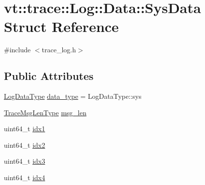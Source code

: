 \hypertarget{structvt_1_1trace_1_1_log_1_1_data_1_1_sys_data}{}\section{vt\+:\+:trace\+:\+:Log\+:\+:Data\+:\+:Sys\+Data Struct Reference}
\label{structvt_1_1trace_1_1_log_1_1_data_1_1_sys_data}


{\ttfamily \#include $<$trace\+\_\+log.\+h$>$}

\subsection*{Public Attributes}
\begin{DoxyCompactItemize}
\item 
\hyperlink{structvt_1_1trace_1_1_log_ae1c08093fd18967b7d4912d04d6acc3d}{Log\+Data\+Type} \hyperlink{structvt_1_1trace_1_1_log_1_1_data_1_1_sys_data_abf36342ab6f92372bf13cf35be7bbb25}{data\+\_\+type} = Log\+Data\+Type\+::sys
\item 
\hyperlink{namespacevt_1_1trace_aeb598f45d67d41db7902e494f2f0ce59}{Trace\+Msg\+Len\+Type} \hyperlink{structvt_1_1trace_1_1_log_1_1_data_1_1_sys_data_a514d2e0977e4acf99920ed45a910ae0a}{msg\+\_\+len}
\item 
uint64\+\_\+t \hyperlink{structvt_1_1trace_1_1_log_1_1_data_1_1_sys_data_a446ec2588d49845c97e4485695943041}{idx1}
\item 
uint64\+\_\+t \hyperlink{structvt_1_1trace_1_1_log_1_1_data_1_1_sys_data_a5df5c2a04facacefdb450e4d228ab8bb}{idx2}
\item 
uint64\+\_\+t \hyperlink{structvt_1_1trace_1_1_log_1_1_data_1_1_sys_data_ab7d9be6fe4d8eb35a832a33f17eaff70}{idx3}
\item 
uint64\+\_\+t \hyperlink{structvt_1_1trace_1_1_log_1_1_data_1_1_sys_data_a7676b739d24eef60c98bf040aa631898}{idx4}
\end{DoxyCompactItemize}
